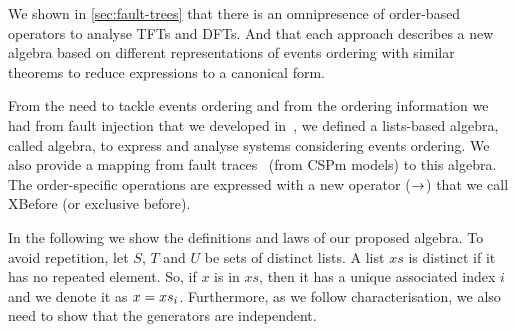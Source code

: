 \documentclass[en,twoside,onehalfspacing,phd]{risethesis}
\def\xbeforeop{\ensuremath\rightarrow}
\newcommand{\nth}[2]{\ensuremath #1_{#2}}
\def\algebraset{\ensuremath\operatorname{\mathbf{atf}}}
\begin{document}

We shown in \cref{sec:fault-trees} that there is an omnipresence of order-based operators to analyse \acp{TFT} and \acp{DFT}.
And that each approach describes a new algebra based on different representations of events ordering with similar theorems to reduce expressions to a canonical form.

From the need to tackle events ordering and from the ordering information we had from fault injection that we developed in~\cite{DM2012}, we defined a lists-based algebra, called \ac{algebra}, to express and analyse systems considering events ordering.
We also provide a mapping from fault traces~\cite{DM2012} (from \ac{CSPm} models) to this algebra.
The order-specific operations are expressed with a new operator ($\xbeforeop$) that we call XBefore (or exclusive before).




In the following we show the definitions and laws of our proposed \ac{algebra}.
To avoid repetition, let $S$, $T$ and $U$ be sets of distinct lists.
A list $xs$ is distinct if it has no repeated element.
So, if $x$ is in $xs$, then it has a unique associated index $i$ and we denote it as $x = \nth{xs}{i}$.
Furthermore, as we follow  characterisation, we also need to show that the generators are independent.
\end{document}
